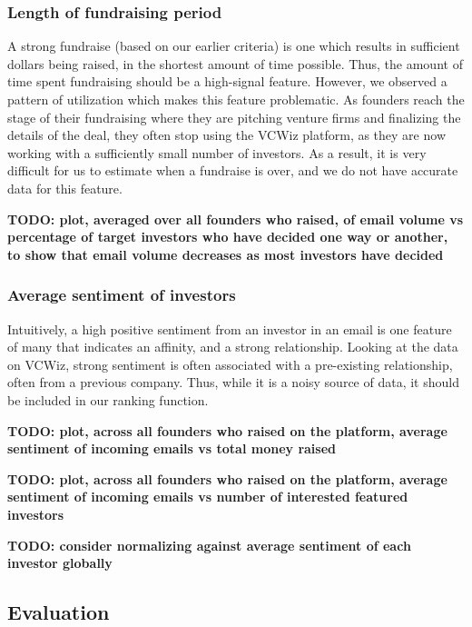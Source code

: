 \subsubsection{Length of fundraising period}

A strong fundraise (based on our earlier criteria) is one which results in sufficient dollars being raised, in the shortest amount of time possible. Thus, the amount of time spent fundraising should be a high-signal feature. However, we observed a pattern of utilization which makes this feature problematic. As founders reach the stage of their fundraising where they are pitching venture firms and finalizing the details of the deal, they often stop using the VCWiz platform, as they are now working with a sufficiently small number of investors. As a result, it is very difficult for us to estimate when a fundraise is over, and we do not have accurate data for this feature.

\textbf{TODO: plot, averaged over all founders who raised, of email volume vs percentage of target investors who have decided one way or another, to show that email volume decreases as most investors have decided}

\subsubsection{Average sentiment of investors}

Intuitively, a high positive sentiment from an investor in an email is one feature of many that indicates an affinity, and a strong relationship. Looking at the data on VCWiz, strong sentiment is often associated with a pre-existing relationship, often from a previous company. Thus, while it is a noisy source of data, it should be included in our ranking function.

\textbf{TODO: plot, across all founders who raised on the platform, average sentiment of incoming emails vs total money raised}

\textbf{TODO: plot, across all founders who raised on the platform, average sentiment of incoming emails vs number of interested featured investors}

\textbf{TODO: consider normalizing against average sentiment of each investor globally}

\subsection{Evaluation}

